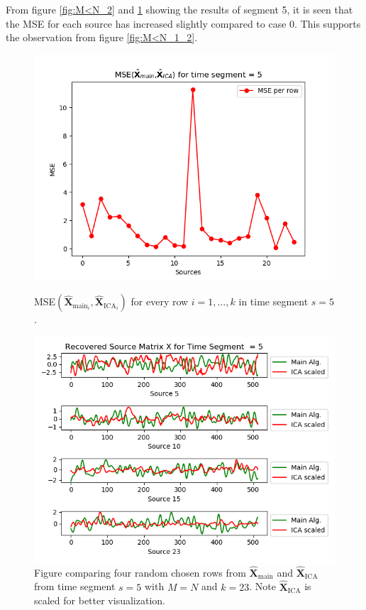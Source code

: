 \noindent 
From figure \ref{fig:M<N_2} and \ref{fig:M<N_3} showing the results of segment 5, it is seen that the MSE for each source has increased slightly compared to case 0. 
This supports the observation from figure \ref{fig:M<N_1_2}.      
\begin{figure}[H]
\begin{widepage}
    \begin{minipage}[t]{.45\textwidth}
\centering
\includegraphics[width=1\linewidth]{figures/ch_7/resultat/mse_third_removed_ica_timeseg5.png}
\caption{MSE$\left(\hat{\mathbf{X}}_{\text{main}_{i}},\hat{\mathbf{X}}_{\text{ICA}_{i}}\right)$ for every row $i = 1, \dots, k$ in time segment $s=5$.}
\label{fig:M<N_2}
\end{minipage} 
\hspace{0.5cm}
\begin{minipage}[t]{.45\textwidth}
\centering
\includegraphics[width=1\linewidth]{figures/ch_7/resultat/EEG_third_removed_scaled_timeseg5S1_CClean.png}
\caption{Figure comparing four random chosen rows from $\hat{\mathbf{X}}_{\text{main}}$ and $\hat{\mathbf{X}}_{\text{ICA}}$ from time segment $s = 5$ with $M = N$ and $k=23$. Note $\hat{\mathbf{X}}_{\text{ICA}}$ is scaled for better visualization.}
	\label{fig:M<N_3}
    \end{minipage}
\end{widepage}
\end{figure}
